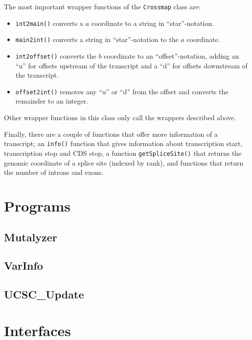 \documentclass{article}
\begin{document}
The most important wrapper functions of the \texttt{Crossmap} class are:
\begin{itemize}
\item \texttt{int2main()} converts a $a$ coordinate to a string in
      ``star''-notation.
\item \texttt{main2int()} converts a string in ``star''-notation to the $a$ 
      coordinate.
\item \texttt{int2offset()} converts the $b$ coordinate to an
      ``offset''-notation, adding an ``u'' for offsets upstream of the
      transcript and a ``d'' for offsets downstream of the transcript.
\item \texttt{offset2int()} removes any ``u'' or ``d'' from the offset and
      converts the remainder to an integer.
\end{itemize}

Other wrapper functions in this class only call the wrappers described above.

Finally, there are a couple of functions that offer more information of a 
transcript; an \texttt{info()} function that gives information about
transcription start, transcription stop and CDS stop, a function
\texttt{getSpliceSite()} that returns the genomic coordinate of a splice site
(indexed by rank), and functions that return the number of introns and exons.

\newpage

\section{Programs} \label{sec:programs}

\subsection{Mutalyzer} \label{subsec:mutalyzer}

\subsection{VarInfo} \label{subsec:varinfo}

\subsection{UCSC\_Update} \label{subsec:ucsc_update}

\newpage

\section{Interfaces} \label{sec:interfaces}
\end{document}
